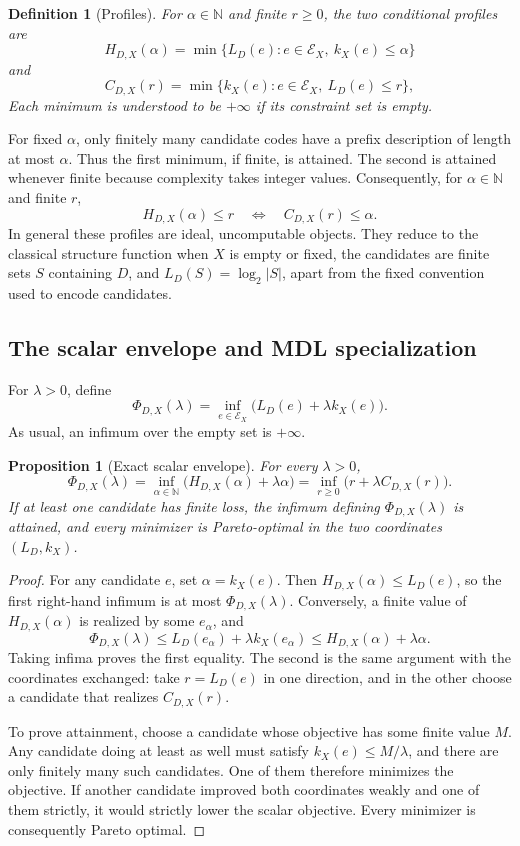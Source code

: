 \documentclass[11pt]{article}
\newtheorem{proposition}[theorem]{Proposition}
\newtheorem{definition}[theorem]{Definition}
\newcommand{\N}{\mathbb{N}}
\begin{document}
\begin{definition}[Profiles]
For \(\alpha\in\N\) and finite \(r\ge0\), the two conditional
profiles are
\[
 H_{D,X}(\alpha)
 =\min\{L_D(e):e\in\mathcal E_X,\ k_X(e)\le\alpha\}
\]
and
\[
 C_{D,X}(r)
 =\min\{k_X(e):e\in\mathcal E_X,\ L_D(e)\le r\},
\]
Each minimum is understood to be \(+\infty\) if its constraint set is empty.
\end{definition}

For fixed \(\alpha\), only finitely many candidate codes have a prefix
description of length at most \(\alpha\).  Thus the first minimum, if finite,
is attained.  The second is attained whenever finite because complexity takes
integer values.
Consequently, for \(\alpha\in\N\) and finite \(r\),
\[
 H_{D,X}(\alpha)\le r
 \quad\Longleftrightarrow\quad
 C_{D,X}(r)\le\alpha.
\]
In general these profiles are ideal, uncomputable objects.  They reduce to the
classical structure function when \(X\) is empty or fixed, the candidates are
finite sets \(S\) containing \(D\), and \(L_D(S)=\log_2|S|\), apart from the
fixed convention used to encode candidates.

\subsection{The scalar envelope and MDL specialization}

For \(\lambda>0\), define
\[
 \Phi_{D,X}(\lambda)
 =\inf_{e\in\mathcal E_X}
   \bigl(L_D(e)+\lambda k_X(e)\bigr).
\]
As usual, an infimum over the empty set is \(+\infty\).

\begin{proposition}[Exact scalar envelope]\label{prop:envelope}
For every \(\lambda>0\),
\[
 \Phi_{D,X}(\lambda)
 =\inf_{\alpha\in\N}
   \bigl(H_{D,X}(\alpha)+\lambda\alpha\bigr)
 =\inf_{r\ge0}
   \bigl(r+\lambda C_{D,X}(r)\bigr).
\]
If at least one candidate has finite loss, the infimum defining
\(\Phi_{D,X}(\lambda)\) is attained, and every minimizer is Pareto-optimal in
the two coordinates \((L_D,k_X)\).
\end{proposition}

\begin{proof}
For any candidate \(e\), set \(\alpha=k_X(e)\).  Then
\(H_{D,X}(\alpha)\le L_D(e)\), so the first right-hand infimum is at most
\(\Phi_{D,X}(\lambda)\).  Conversely, a finite value of
\(H_{D,X}(\alpha)\) is realized by some \(e_\alpha\), and
\[
 \Phi_{D,X}(\lambda)
 \le L_D(e_\alpha)+\lambda k_X(e_\alpha)
 \le H_{D,X}(\alpha)+\lambda\alpha.
\]
Taking infima proves the first equality.  The second is the same argument with
the coordinates exchanged: take \(r=L_D(e)\) in one direction, and in the
other choose a candidate that realizes \(C_{D,X}(r)\).

To prove attainment, choose a candidate whose objective has some finite value
\(M\).  Any candidate doing at least as well must satisfy
\(k_X(e)\le M/\lambda\), and there are only finitely many such candidates.
One of them therefore minimizes the objective.  If another candidate improved
both coordinates weakly and one of them strictly, it would strictly lower the
scalar objective.  Every minimizer is consequently Pareto optimal.
\end{proof}
\end{document}
